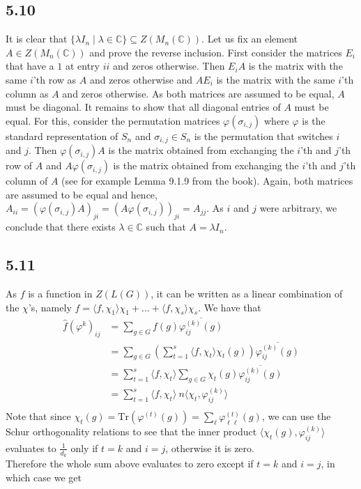 \documentclass[12pt]{article}
\begin{document}
\subsection*{5.10}
It is clear that $\{\lambda I_n \mid \lambda \in \mathbb{C}\} \subseteq Z(M_n(\mathbb{C}))$. Let us fix an element $A \in Z(M_n(\mathbb{C}))$ and prove the reverse inclusion. First consider the matrices $E_i$ that have a $1$ at entry $ii$ and zeros otherwise. Then $E_i A$ is the matrix with the same $i$'th row as $A$ and zeros otherwise and $A E_i$ is the matrix with the same $i$'th column as $A$ and zeros otherwise. As both matrices are assumed to be equal, $A$ must be diagonal. It remains to show that all diagonal entries of $A$ must be equal. For this, consider the permutation matrices $\varphi(\sigma_{i,j})$ where $\varphi$ is the standard representation of $S_n$ and $\sigma_{i,j} \in S_n$ is the permutation that switches $i$ and $j$. Then $\varphi(\sigma_{i,j}) A$ is the matrix obtained from exchanging the $i$'th and $j$'th row of $A$ and $A \varphi(\sigma_{i,j})$ is the matrix obtained from exchanging the $i$'th and $j$'th column of $A$ (see for example Lemma 9.1.9 from the book). Again, both matrices are assumed to be equal and hence, $A_{ii} = (\varphi(\sigma_{i,j}) A)_{ji} = (A \varphi(\sigma_{i,j}))_{ji} = A_{jj}$. As $i$ and $j$ were arbitrary, we conclude that there exists $\lambda \in \mathbb{C}$ such that $A = \lambda I_n$.


\subsection*{5.11}

As $f$ is a function in $Z(L(G))$, it can be written as a linear combination of the $\chi$'s, namely $f = \langle f, \chi_1 \rangle \chi_1 + ... + \langle f, \chi_s \rangle \chi_s$. We have that
\begin{align*}
    \widehat{f}(\varphi^{k})_{ij} &=
    \sum_{g \in G} f(g) \overline{\varphi^{(k)}_{ij}(g)} \\
    &= \sum_{g \in G} \left( \sum_{t = 1}^{s} \langle f, \chi_t \rangle \chi_t(g) \right) \overline{\varphi^{(k)}_{ij}(g)} \\
    &= \sum_{t = 1}^{s} \langle f, \chi_t \rangle \sum_{g \in G} \chi_t(g) \overline{\varphi^{(k)}_{ij}(g)} \\
    &= \sum_{t = 1}^{s} \langle f, \chi_t \rangle \ n \langle \chi_t, \varphi^{(k)}_{ij} \rangle \\
\end{align*}
\noindent
Note that since $\chi_t(g) = \mathrm{Tr}(\varphi^{(t)}(g)) = \sum_\ell \varphi^{(t)}_{\ell \ell}(g)$, we can use the Schur orthogonality relations to see that the inner product $\langle \chi_t(g), \varphi^{(k)}_{ij} \rangle$ evaluates to $\frac{1}{d_k}$ only if $t = k$ and $i = j$, otherwise it is zero.\\
Therefore the whole sum above evaluates to zero except if $t = k$ and $i = j$, in which case we get
\end{document}
